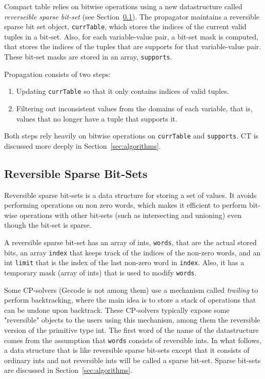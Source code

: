 \documentclass[a4paper,11pt]{article}
\newcommand{\T}[1]{\texttt{#1}}
\newcommand{\Secref}[1]{Section~\ref{#1}}
\numberwithin{equation}{section}
\begin{document}
Compact table relies on bitwise operations using a new datastructure
called \emph{reverseible sparse bit-set} (see \Secref{bg:sbs}).
The propagator maintains a reversible sparse bit set object, \texttt{currTable},
which stores the indices of the current valid tuples in a bit-set.
Also, for each variable-value pair, a bit-set mask is computed, that stores the
indices of the tuples that are supports for that variable-value pair.
These bit-set masks are stored in an array, \texttt{supports}.

Propagation consists of two steps:

\begin{enumerate}
  \item Updating \texttt{currTable} so that it only contains indices
    of valid tuples.
  \item Filtering out inconsistent values from the domains of each
    variable, that is,
    values that no longer have a tuple that supports it.
\end{enumerate}

Both steps rely heavily on bitwise operations on \T{currTable} and
\T{supports}. CT is discussed more deeply in \Secref{sec:algorithms}.

\subsection{Reversible Sparse Bit-Sets}
\label{bg:sbs}
Reversible sparse bit-sets is a data structure for storing 
a set of values. It avoids performing operations on non zero
words, which makes it efficient to perform bit-wise operations
with other bit-sets (such as intersecting and unioning)
even though the bit-set is sparse.

A reversible sparse bit-set has an array of ints, \T{words},
that are the actual stored bits, an array \T{index} that
keeps track of the indices of the non-zero words, and an
int \T{limit} that is the index of the last non-zero word
in \T{index}. Also, it has a temporary mask (array of ints)
that is used to modify \T{words}.

Some CP-solvers (Gecode is not among them)
use a mechanism called \emph{trailing} to perform backtracking,
where the main idea is to store a stack of operations that can
be undone upon backtrack. These CP-solvers typically expose
some "reversible" objects to the users using this mechanism,
among them the reversible version of the primitive type int.
The first word of the name of the datastructure comes from
the assumption that \T{words} consists of
reversible ints. In what follows, a data structure that is 
like reversible sparse bit-sets except that it consists 
of ordinary ints and not reversible ints
will be called a sparse bit-set. Sparse bit-sets are discussed
in \Secref{sec:algorithms}.
\end{document}
